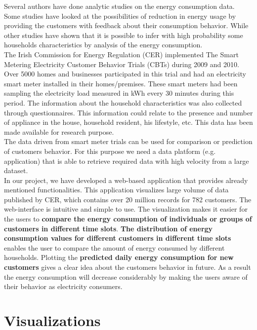 \documentclass{sig-alternate-10pt}
\begin{document}
Several authors have done analytic studies on the energy consumption data. Some studies have looked at the possibilities of reduction in energy usage by providing the customers with feedback about their consumption behavior.\cite{1} While other studies have shown that it is possible to infer with high probability some households characteristics by analysis of the energy consumption.\cite{2,3}\\

The Irish Commission for Energy Regulation (CER) implemented The Smart Metering Electricity Customer Behavior Trials (CBTs) during 2009 and 2010. Over 5000 homes and businesses participated in this trial and had an electricity smart meter installed in their homes/premises. These smart meters had been sampling the electricity load measured in kWh every 30 minutes during this period. The information about the household characteristics was also collected through questionnaires. This information could relate to the presence and number of appliance in the house, household resident, his lifestyle, etc. This data has been made available for research purpose.\cite{4}\\

The data driven from smart meter trials can be used for comparison or prediction of customers behavior. For this purpose we need a data platform (e.g. application) that is able to retrieve required data with high velocity from a large dataset.\\
 
In our project, we have developed a web-based application that provides already mentioned functionalities. This application visualizes large volume of data published by CER, which contains over 20 million records for 782 customers. The web-interface is intuitive and simple to use. The visualization makes it easier for the users to \textbf{compare the energy consumption of individuals or groups of customers in different time slots}. \textbf{The distribution of energy consumption values for different customers in different time slots} enables the user to compare the amount of energy consumed by different households. Plotting the \textbf{predicted daily energy consumption for new customers} gives a clear idea about the customers behavior in future. As a result the energy consumption will decrease considerably by making the users aware of their behavior as electricity consumers.\\


\section{Visualizations}
\end{document}
